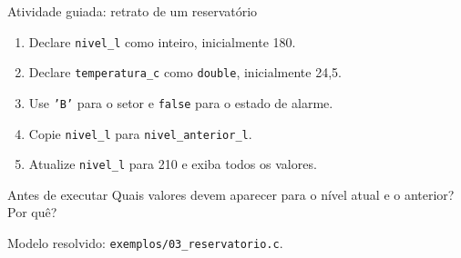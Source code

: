 \begin{frame}{Atividade guiada: retrato de um reservatório}
\begin{enumerate}
\item Declare \texttt{nivel\_l} como inteiro, inicialmente 180.
\item Declare \texttt{temperatura\_c} como \texttt{double}, inicialmente 24,5.
\item Use \texttt{'B'} para o setor e \texttt{false} para o estado de alarme.
\item Copie \texttt{nivel\_l} para \texttt{nivel\_anterior\_l}.
\item Atualize \texttt{nivel\_l} para 210 e exiba todos os valores.
\end{enumerate}
\begin{block}{Antes de executar}
Quais valores devem aparecer para o nível atual e o anterior? Por quê?
\end{block}
\small Modelo resolvido: \texttt{exemplos/03\_reservatorio.c}.
\end{frame}

